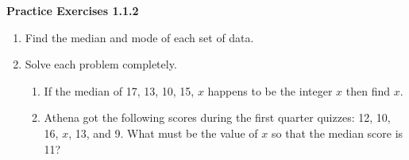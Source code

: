\vspace{1ex}
\noindent\textbf{Practice Exercises 1.1.2}

\vspace{0.75ex}

\begin{enumerate}[label = \Alph*. ]
\item Find the median and mode  of each set of data.
\begin{enumerate}[label = \arabic*. ]
\end{enumerate}  

\item Solve each problem completely. 
\begin{enumerate}[label = \arabic*. ]
\item If the median of 17, 13, 10, 15, $x$ happens to be the integer $x$ then find $x$.
\item Athena got the following scores during the first quarter quizzes: 12, 10, 16, $x$, 13, and 9. What must be the value of $x$ so that the median score is 11?

\end{enumerate}  
\end{enumerate}   

